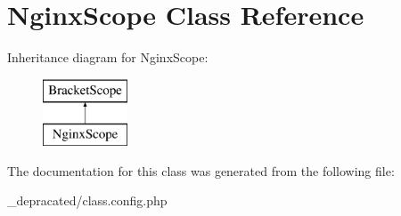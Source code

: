 \hypertarget{class_nginx_scope}{
\section{\-Nginx\-Scope \-Class \-Reference}
\label{class_nginx_scope}
}
\-Inheritance diagram for \-Nginx\-Scope\-:\begin{figure}[H]
\begin{center}
\leavevmode
\includegraphics[height=2.000000cm]{class_nginx_scope}
\end{center}
\end{figure}


\-The documentation for this class was generated from the following file\-:\begin{DoxyCompactItemize}
\item 
\-\_\-depracated/class.\-config.\-php\end{DoxyCompactItemize}
